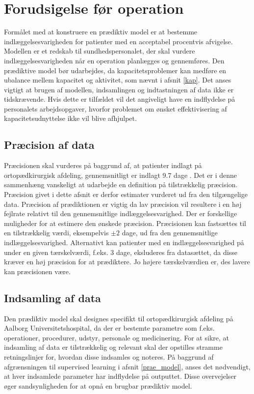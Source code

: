 \section{Forudsigelse før operation} 
Formålet med at konstruere en prædiktiv model er at bestemme indlæggelsesvarigheden for patienter med en acceptabel procentvis afvigelse. Modellen er et redskab til sundhedspersonalet, der skal vurdere indlæggelsesvarigheden når en operation planlægges og gennemføres. Den prædiktive model bør udarbejdes, da kapacitetsproblemer kan medføre en ubalance mellem kapacitet og aktivitet, som nævnt i afsnit \ref{kap}. Det anses vigtigt at brugen af modellen, indsamlingen og indtastningen af data ikke er tidskrævende. Hvis dette er tilfældet vil det angiveligt have en indflydelse på personalets arbejdsopgaver, hvorfor problemet om ønsket effektivisering af kapacitetsudnyttelse ikke vil blive afhjulpet.

\subsection{Præcision af data}
Præcisionen skal vurderes på baggrund af, at patienter indlagt på ortopædkirurgisk afdeling, gennemsnitligt er indlagt 9.7 dage .
Det er i denne sammenhæng vanskeligt at udarbejde en definition på tilstrækkelig præcision. Præcision givet i dette afsnit er derfor estimater vurderet ud fra den tilgængelige data.
Præcision af prædiktionen er vigtig da lav præcision vil resultere i en høj fejlrate relativt til den gennemsnitlige indlæggelsesvarighed.
Der er forskellige muligheder for at estimere den ønskede præcision. 
Præcisionen kan fastsættes til en tilstrækkelig værdi, eksempelvis $\pm 2$ dage, ud fra den gennemsnitlige indlæggelsesvarighed. 
Alternativt kan patienter med en indlæggelsesvarighed på under en given tærskelværdi, f.eks. $3$ dage, eksluderes fra datasættet, da disse kræver en høj præcision for at prædiktere. Jo højere tærskelværdien er, des lavere kan præcisionen være.



\subsection{Indsamling af data}
Den prædiktiv model skal designes specifikt til ortopædkirurgisk afdeling på Aalborg Universitetshospital, da der er bestemte parametre som f.eks. operationer, procedurer, udstyr, personale og medicinering. For at sikre, at indsamling af data er tilstrækkelig og relevant skal der opstilles stramme retningslinjer for, hvordan disse indsamles og noteres. På baggrund af afgrænsningen til supervised learning i afsnit \ref{prae_model}, anses det nødvendigt, at hver indsamlede parameter har indflydelse på outputtet. Disse overvejelser øger sandsynligheden for at opnå en brugbar prædiktiv model. 


